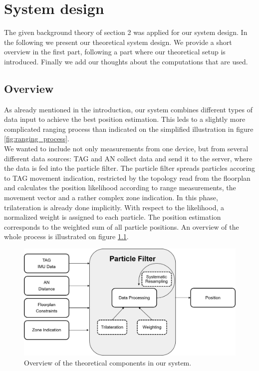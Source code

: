 
\chapter{System design} %

\label{Chapter3} %
The given background theory of section 2 was applied for our system design. In the following we present our theoretical system design. We provide a short overview in the first part, following a part where our theoretical setup is introduced. Finally we add our thoughts about the computations that are used.


\section{Overview}
As already mentioned in the introduction, our system combines different types of data input to achieve the best position estimation. This leds to a slightly more complicated ranging process than indicated on the simplified illustration in figure \ref{fig:ranging_process}.\\
We wanted to include not only measurements from one device, but from several different data sources:
TAG and AN collect data and send it to the server, where the data is fed into the particle filter. The particle filter spreads particles accoring to TAG movement indication, restricted by the topology read from the floorplan and calculates the position likelihood according to range measurements, the movement vector and a rather complex zone indication. In this phase, trilateration is already done implicitly. With respect to the likelihood, a normalized weight is assigned to each particle. The position estimation corresponds to the weighted sum of all particle positions.
An overview of the whole process is illustrated on figure \ref{fig:particle_filter_design}.

\begin{figure}[th]
\centering
\includegraphics[width=1.0\textwidth]{Figures/particle_filter_design}
\decoRule
\caption[Particle filter design]{Overview of the theoretical components in our system.}
\label{fig:particle_filter_design}
\end{figure}



